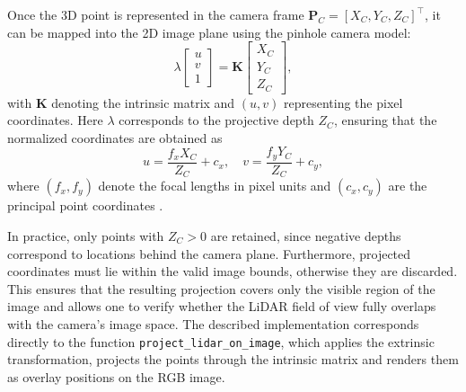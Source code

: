 \documentclass[english, bachelor, utf8]{base/thesis_telematics}
\begin{document}
Once the 3D point is represented in the camera frame $\mathbf{P}_C = [X_C, Y_C, Z_C]^\top$, it can 
be mapped into the 2D image plane using the pinhole camera model:
\[
  \lambda
  \begin{bmatrix}
  u \\ v \\ 1
  \end{bmatrix}
  =
  \mathbf{K}
  \begin{bmatrix}
  X_C \\ Y_C \\ Z_C
  \end{bmatrix},
\]
with $\mathbf{K}$ denoting the intrinsic matrix and $(u,v)$ representing the pixel coordinates. 
Here $\lambda$ corresponds to the projective depth $Z_C$, ensuring that the normalized coordinates 
are obtained as
\[
  u = \frac{f_x X_C}{Z_C} + c_x, \quad v = \frac{f_y Y_C}{Z_C} + c_y,
\]
where $(f_x,f_y)$ denote the focal lengths in pixel units and $(c_x,c_y)$ are the principal point 
coordinates \cite{review2024lidarcamera}.

In practice, only points with $Z_C > 0$ are retained, since negative depths correspond to locations 
behind the camera plane. Furthermore, projected coordinates must lie within the valid image bounds, 
otherwise they are discarded. This ensures that the resulting projection covers only the visible 
region of the image and allows one to verify whether the LiDAR field of view fully overlaps with the 
camera’s image space. The described implementation corresponds directly to the function 
\texttt{project\_lidar\_on\_image}, which applies the extrinsic transformation, projects the points 
through the intrinsic matrix and renders them as overlay positions on the RGB image.



\end{document}
